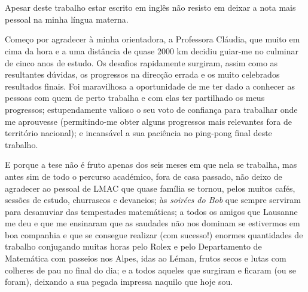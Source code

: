 
\section*{\acknowledgments}


Apesar deste trabalho estar escrito em inglês não resisto em deixar a nota mais pessoal na minha língua materna.

Começo por agradecer à minha orientadora, a Professora Cláudia,  que muito em cima da hora e a uma distância de quase 2000 km decidiu guiar-me no culminar de cinco anos de estudo. 
Os desafios rapidamente surgiram, assim como as resultantes dúvidas, os progressos na direcção errada e os muito celebrados resultados finais. 
Foi maravilhosa a oportunidade de me ter dado a conhecer as pessoas com quem de perto trabalha e com elas ter partilhado os meus progressos; estupendamente valioso o seu voto de confiança para trabalhar onde me aprouvesse (permitindo-me obter alguns progressos mais relevantes fora de território nacional); e incansável a sua paciência no ping-pong final deste trabalho.

E porque a tese não é fruto apenas dos seis meses em que nela se trabalha, mas antes sim de todo o percurso académico, fora de casa passado, não deixo de agradecer ao pessoal de LMAC que quase família se tornou, pelos muitos cafés, sessões de estudo, churrascos e devaneios; às \textit{soirées do Bob} que sempre serviram para desanuviar das tempestades matemáticas; a todos os amigos que Lausanne me deu e que me ensinaram que as saudades não nos dominam se estivermos em boa companhia e que se consegue realizar (com sucesso!) enormes quantidades de trabalho conjugando muitas horas pelo Rolex e pelo Departamento de Matemática com passeios nos Alpes, idas ao Léman, frutos secos e lutas com colheres de pau no final do dia; e a todos aqueles que surgiram e ficaram (ou se foram), deixando a sua pegada impressa naquilo que hoje sou.


